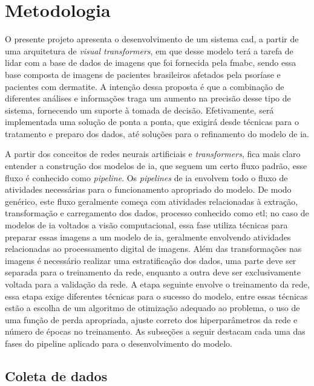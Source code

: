 \section{Metodologia}

O presente projeto apresenta o desenvolvimento de um sistema \gls{cad}, a partir de uma arquitetura de \textit{visual transformers}, em que desse modelo terá a tarefa de lidar com a base de dados de imagens que foi fornecida pela \gls{fmabc}, sendo essa base composta de imagens de pacientes brasileiros afetados pela psoríase e pacientes com dermatite. A intenção dessa proposta é que a combinação de diferentes análises e informações traga um aumento na precisão desse tipo de sistema, fornecendo um suporte à tomada de decisão. Efetivamente, será implementada uma solução de ponta a ponta, que exigirá desde técnicas para o tratamento e preparo dos dados, até soluções para o refinamento do modelo de \gls{ia}.

A partir dos conceitos de redes neurais artificiais e \textit{transformers}, fica mais claro entender a construção dos modelos de \gls{ia}, que seguem um certo fluxo padrão, esse fluxo é conhecido como \textit{pipeline}. Os \textit{pipelines} de \gls{ia} envolvem todo o fluxo de atividades necessárias para o funcionamento apropriado do modelo. De modo genérico, este fluxo geralmente começa com atividades relacionadas à extração, transformação e carregamento dos dados, processo conhecido como \gls{etl}; no caso de modelos de \gls{ia} voltados a visão computacional, essa fase utiliza técnicas para preparar essas imagens a um modelo de \gls{ia}, geralmente envolvendo atividades relacionadas ao processamento digital de imagens. Além das transformações nas imagens é necessário realizar uma estratificação dos dados, uma parte deve ser separada para o treinamento da rede, enquanto a outra deve ser exclusivamente voltada para a validação da rede. A etapa seguinte envolve o treinamento da rede, essa etapa exige diferentes técnicas para o sucesso do modelo, entre essas técnicas estão a escolha de um algoritmo de otimização adequado ao problema, o uso de uma função de perda apropriada, ajuste correto dos hiperparâmetros da rede e número de épocas no treinamento. As subseções a seguir destacam cada uma das fases do pipeline aplicado para o desenvolvimento do modelo.

\subsection{Coleta de dados}

